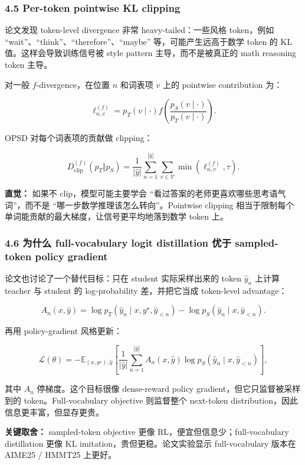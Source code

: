 \subsubsection{4.5 Per-token pointwise KL clipping}

论文发现 token-level divergence 非常 heavy-tailed：一些风格 token，例如 ``wait''、``think''、``therefore''、``maybe'' 等，可能产生远高于数学 token 的 KL 值。这样会导致训练信号被 style pattern 主导，而不是被真正的 math reasoning token 主导。

对一般 $f$-divergence，在位置 $n$ 和词表项 $v$ 上的 pointwise contribution 为：

\[
\ell^{(f)}_{n,v}
=
 p_T(v\mid\cdot)
 f\!\left(
 \frac{p_S(v\mid\cdot)}{p_T(v\mid\cdot)}
 \right).
\]

OPSD 对每个词表项的贡献做 clipping：

\[
D_{\mathrm{clip}}^{(f)}(p_T\Vert p_S)
=
\frac{1}{|\hat{y}|}
\sum_{n=1}^{|\hat{y}|}
\sum_{v\in\mathcal{V}}
\min(\ell^{(f)}_{n,v},\tau).
\]

\begin{intubox}
\textbf{直觉：} 如果不 clip，模型可能主要学会 ``看过答案的老师更喜欢哪些思考语气词''，而不是 ``哪一步数学推理该怎么转向''。Pointwise clipping 相当于限制每个单词能贡献的最大梯度，让信号更平均地落到数学 token 上。
\end{intubox}

\subsubsection{4.6 为什么 full-vocabulary logit distillation 优于 sampled-token policy gradient}

论文也讨论了一个替代目标：只在 student 实际采样出来的 token $\hat{y}_n$ 上计算 teacher 与 student 的 log-probability 差，并把它当成 token-level advantage：

\[
A_n(x,\hat{y})
=
\log p_T(\hat{y}_n\mid x,y^\star,\hat{y}_{<n})
-
\log p_S(\hat{y}_n\mid x,\hat{y}_{<n}).
\]

再用 policy-gradient 风格更新：

\[
\mathcal{L}(\theta)
=
-
\mathbb{E}_{(x,y^\star),\hat{y}}
\left[
\frac{1}{|\hat{y}|}
\sum_{n=1}^{|\hat{y}|}
A_n(x,\hat{y})
\log p_S(\hat{y}_n\mid x,\hat{y}_{<n})
\right],
\]

其中 $A_n$ 停梯度。这个目标很像 dense-reward policy gradient，但它只监督被采样到的 token。Full-vocabulary objective 则监督整个 next-token distribution，因此信息更丰富，但显存更贵。

\begin{summarybox}
\textbf{关键取舍：} sampled-token objective 更像 RL，便宜但信息少；full-vocabulary distillation 更像 KL imitation，贵但更稳。论文实验显示 full-vocabulary 版本在 AIME25 / HMMT25 上更好。
\end{summarybox}

